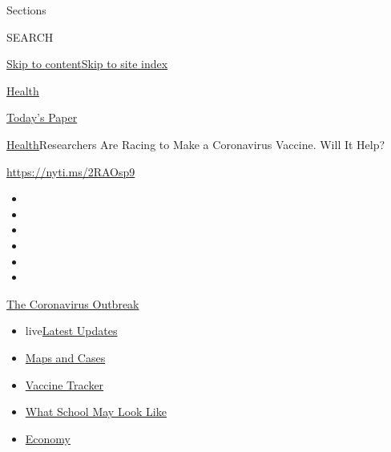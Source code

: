 Sections

SEARCH

\protect\hyperlink{site-content}{Skip to
content}\protect\hyperlink{site-index}{Skip to site index}

\href{https://www.nytimes.com/section/health}{Health}

\href{https://myaccount.nytimes.com/auth/login?response_type=cookie\&client_id=vi}{}

\href{https://www.nytimes.com/section/todayspaper}{Today's Paper}

\href{/section/health}{Health}\textbar{}Researchers Are Racing to Make a
Coronavirus Vaccine. Will It Help?

\url{https://nyti.ms/2RAOsp9}

\begin{itemize}
\item
\item
\item
\item
\item
\item
\end{itemize}

\href{https://www.nytimes.com/news-event/coronavirus?action=click\&pgtype=Article\&state=default\&region=TOP_BANNER\&context=storylines_menu}{The
Coronavirus Outbreak}

\begin{itemize}
\tightlist
\item
  live\href{https://www.nytimes.com/2020/08/02/world/coronavirus-updates.html?action=click\&pgtype=Article\&state=default\&region=TOP_BANNER\&context=storylines_menu}{Latest
  Updates}
\item
  \href{https://www.nytimes.com/interactive/2020/us/coronavirus-us-cases.html?action=click\&pgtype=Article\&state=default\&region=TOP_BANNER\&context=storylines_menu}{Maps
  and Cases}
\item
  \href{https://www.nytimes.com/interactive/2020/science/coronavirus-vaccine-tracker.html?action=click\&pgtype=Article\&state=default\&region=TOP_BANNER\&context=storylines_menu}{Vaccine
  Tracker}
\item
  \href{https://www.nytimes.com/interactive/2020/07/29/us/schools-reopening-coronavirus.html?action=click\&pgtype=Article\&state=default\&region=TOP_BANNER\&context=storylines_menu}{What
  School May Look Like}
\item
  \href{https://www.nytimes.com/live/2020/07/31/business/stock-market-today-coronavirus?action=click\&pgtype=Article\&state=default\&region=TOP_BANNER\&context=storylines_menu}{Economy}
\end{itemize}

